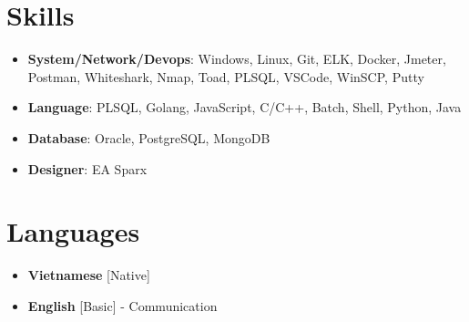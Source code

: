 \documentclass[11pt,a4paper,sans]{moderncv}
\begin{document}
\section{Skills}
{\begin{itemize}[leftmargin=0.6cm, label={\textbullet}]
	\item \textbf{System/Network/Devops}: Windows, Linux, Git, ELK, Docker, Jmeter, Postman, Whiteshark, Nmap, Toad, PLSQL, VSCode, WinSCP, Putty
	\item \textbf{Language}: PLSQL, Golang, JavaScript, C/C++, Batch, Shell, Python, Java  
	\item \textbf{Database}: Oracle, PostgreSQL, MongoDB
	\item \textbf{Designer}: EA Sparx
\end{itemize}}

\section{Languages}
\begin{multicols}{2}
    \begin{itemize}[label=\textbullet]
    \item \textbf{Vietnamese} [Native]
    \item {\textbf{English} [Basic] - Communication}
    \end{itemize}
\end{multicols}
\end{document}
